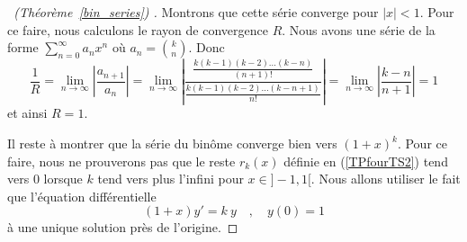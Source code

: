 {\begin{proof}[\UOproof\ (Théorème~\ref{bin_series}) \theory]
Montrons que cette série converge pour $|x|<1$.  Pour ce faire, nous
calculons le rayon de convergence $R$.  Nous avons une série de la forme
$\displaystyle \sum_{n=0}^\infty a_n x^n$ où
$\displaystyle a_n = \binom{k}{n}$.  Donc 
\[
\frac{1}{R} = \lim_{n\rightarrow \infty} \left|\frac{a_{n+1}}{a_n}\right|
= \lim_{n\rightarrow \infty} \left|
\frac{\displaystyle \frac{k(k-1)(k-2)\ldots(k-n)}{(n+1)!}}
{\displaystyle \frac{k(k-1)(k-2)\ldots(k-n+1)}{n!}} \right|
= \lim_{n\rightarrow \infty} \left| \frac{k-n}{n+1} \right| = 1
\]
et ainsi $R=1$.

Il reste à montrer que la série du binôme converge bien vers
$(1+x)^k$.  Pour ce faire, nous ne prouverons pas que le reste
$r_k(x)$ définie en (\ref{TPfourTS2}) tend vers $0$ lorsque $k$ tend
vers plus l'infini pour $x \in ]-1,1[$.  Nous allons utiliser le fait
que l'équation différentielle
\begin{equation} \label{binODE}
(1+x) y'= k\ y \quad , \quad y(0)=1
\end{equation}
à une unique solution près de l'origine.


\end{proof}}
